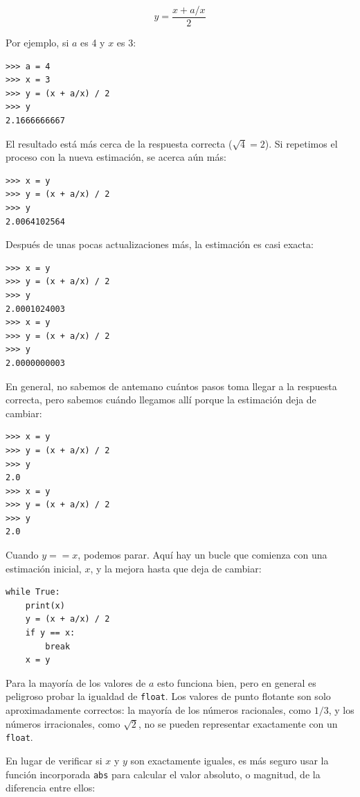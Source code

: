 $$y = \frac{x + a/x}{2}$$

Por ejemplo, si $a$ es 4 y $x$ es 3:

\begin{lstlisting}
>>> a = 4
>>> x = 3
>>> y = (x + a/x) / 2
>>> y
2.1666666667
\end{lstlisting}

El resultado está más cerca de la respuesta correcta ($\sqrt{4} = 2$). Si repetimos el proceso con la nueva estimación, se acerca aún más:

\begin{lstlisting}
>>> x = y
>>> y = (x + a/x) / 2
>>> y
2.0064102564
\end{lstlisting}

Después de unas pocas actualizaciones más, la estimación es casi exacta:

\begin{lstlisting}
>>> x = y
>>> y = (x + a/x) / 2
>>> y
2.0001024003
>>> x = y
>>> y = (x + a/x) / 2
>>> y
2.0000000003
\end{lstlisting}

En general, no sabemos de antemano cuántos pasos toma llegar a la respuesta correcta, pero sabemos cuándo llegamos allí porque la estimación deja de cambiar:

\begin{lstlisting}
>>> x = y
>>> y = (x + a/x) / 2
>>> y
2.0
>>> x = y
>>> y = (x + a/x) / 2
>>> y
2.0
\end{lstlisting}

Cuando $y == x$, podemos parar. Aquí hay un bucle que comienza con una estimación inicial, $x$, y la mejora hasta que deja de cambiar:

\begin{lstlisting}
while True:
    print(x)
    y = (x + a/x) / 2
    if y == x:
        break
    x = y
\end{lstlisting}

Para la mayoría de los valores de $a$ esto funciona bien, pero en general es peligroso probar la igualdad de \texttt{float}. Los valores de punto flotante son solo aproximadamente correctos: la mayoría de los números racionales, como $1/3$, y los números irracionales, como $\sqrt{2}$, no se pueden representar exactamente con un \texttt{float}.

En lugar de verificar si $x$ y $y$ son exactamente iguales, es más seguro usar la función incorporada \texttt{abs} para calcular el valor absoluto, o magnitud, de la diferencia entre ellos:

